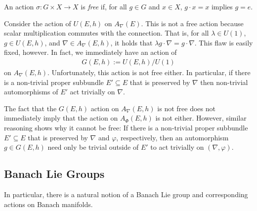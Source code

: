 \documentclass[12pt]{ociamthesis}  %
\begin{document}
\begin{definition}
  An action $\sigma : G\times X\to X$ is \emph{free} if, for all
  $g\in G$ and $x\in X$, $g\cdot x = x$ implies $g = e$.
\end{definition}

\begin{example}\label{ex:not_free}
  Consider the action of $U(E,h)$ on $A_\nabla(E)$. This is not a free action
  because scalar multiplication commutes with the connection. That is,
  for all $\lambda\in U(1)$, $g\in U(E,h)$, and $\nabla\in A_\nabla(E,h)$,
  it holds that $\lambda g\cdot \nabla = g\cdot\nabla$. This flaw is easily fixed,
  however. In fact, we immediately have an action of
  \begin{align*}
    G(E,h) := U(E,h) / U(1)
  \end{align*}
  on $A_\nabla(E,h)$. Unfortunately, this action is not free either. In particular,
  if there is a non-trivial proper subbundle $E'\subseteq E$ that is preserved
  by $\nabla$ then non-trivial automorphisms of $E'$ act trivially on $\nabla$.
\end{example}

\begin{example}\label{ex:not_free_double}
  The fact that the $G(E,h)$ action on $A_\nabla(E,h)$ is not free does not
  immediately imply that the action on $A_\Phi(E,h)$ is not either. However,
  similar reasoning shows why it cannot be free: If there is a non-trivial
  proper subbundle $E'\subseteq E$ that is preserved by $\nabla$ and $\varphi$,
  respectively, then an automorphism $g\in G(E,h)$ need only be trivial
  outside of $E'$ to act trivially on $(\nabla,\varphi)$.
\end{example}


\subsection{Banach Lie Groups}

In particular, there is a natural notion of a Banach Lie group and
corresponding actions on Banach manifolds.
\end{document}
